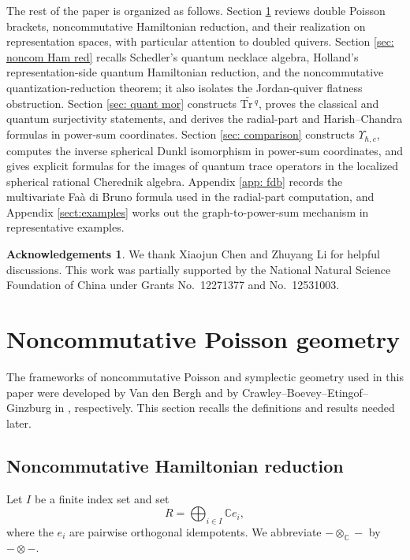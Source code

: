 \documentclass[11pt,reqno]{amsart}
\theoremstyle{definition}
\newtheorem*{ack}{Acknowledgements}
\newcommand{\bbC}{\mathbb{C}}
\newcommand{\Tr}{\mathrm{Tr} \,}
\begin{document}
The rest of the paper is organized
as follows.
Section \ref{sect:NPG} reviews double Poisson brackets, noncommutative
Hamiltonian reduction, and their realization on representation spaces,
with particular attention to doubled quivers.  Section
\ref{sec: noncom Ham red} recalls Schedler's quantum necklace algebra,
Holland's representation-side quantum Hamiltonian reduction, and the
noncommutative quantization-reduction theorem; it also isolates the
Jordan-quiver flatness obstruction.  Section \ref{sec: quant mor} constructs
\(\widetilde{\Tr^q}\), proves the classical and quantum surjectivity
statements, and derives the radial-part and Harish--Chandra formulas in
power-sum coordinates.  Section \ref{sec: comparison} constructs
\(\Upsilon_{\hbar,c}\), computes the inverse spherical Dunkl isomorphism in
power-sum coordinates, and gives explicit formulas for the images of quantum
trace operators in the localized spherical rational Cherednik algebra.
Appendix \ref{app: fdb} records the multivariate Fa\`a di Bruno formula used
in the radial-part computation, and Appendix \ref{sect:examples} works out
the graph-to-power-sum mechanism in representative examples.

\begin{ack}
We thank Xiaojun Chen and Zhuyang Li for helpful discussions.
This work was partially supported by the National Natural Science Foundation of China under Grants No.~12271377 and No.~12531003.
\end{ack}















\section{Noncommutative Poisson geometry}
\label{sect:NPG}

The frameworks of noncommutative Poisson and symplectic geometry used in this paper were developed by Van den Bergh and by Crawley--Boevey--Etingof--Ginzburg in \cite{Van2008Double,CBEG2007}, respectively.
This section recalls the definitions and results needed later.

\subsection{Noncommutative Hamiltonian reduction}
Let \(I\) be a finite index set and set
\[
R=\bigoplus_{i\in I}\bbC e_i,
\]
where the \(e_i\) are pairwise orthogonal idempotents.
We abbreviate \(-\otimes_\bbC-\) by \(-\otimes-\).
\end{document}
